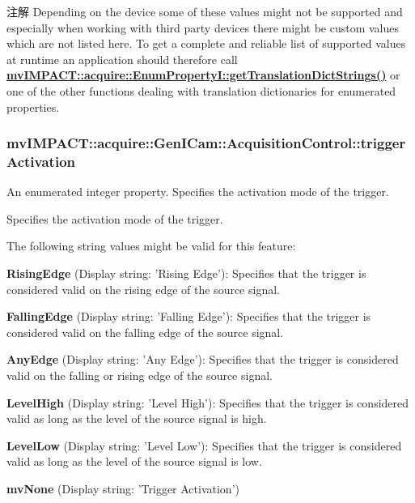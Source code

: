 \begin{DoxyNote}{注解}
Depending on the device some of these values might not be supported and especially when working with third party devices there might be custom values which are not listed here. To get a complete and reliable list of supported values at runtime an application should therefore call {\bfseries \hyperlink{classmv_i_m_p_a_c_t_1_1acquire_1_1_enum_property_i_a0ba6ccbf5ee69784d5d0b537924d26b6}{mv\+I\+M\+P\+A\+C\+T\+::acquire\+::\+Enum\+Property\+I\+::get\+Translation\+Dict\+Strings()}} or one of the other functions dealing with translation dictionaries for enumerated properties. 
\end{DoxyNote}
\hypertarget{classmv_i_m_p_a_c_t_1_1acquire_1_1_gen_i_cam_1_1_acquisition_control_aa99ab36c7369a029d2a7f05c59c3516b}{
\subsubsection[{trigger\+Activation}]{ mv\+I\+M\+P\+A\+C\+T\+::acquire\+::\+Gen\+I\+Cam\+::\+Acquisition\+Control\+::trigger\+Activation}}\label{classmv_i_m_p_a_c_t_1_1acquire_1_1_gen_i_cam_1_1_acquisition_control_aa99ab36c7369a029d2a7f05c59c3516b}


An enumerated integer property. Specifies the activation mode of the trigger. 

Specifies the activation mode of the trigger.

The following string values might be valid for this feature\+:
\begin{DoxyItemize}
\item {\bfseries Rising\+Edge} (Display string\+: 'Rising Edge')\+: Specifies that the trigger is considered valid on the rising edge of the source signal.
\item {\bfseries Falling\+Edge} (Display string\+: 'Falling Edge')\+: Specifies that the trigger is considered valid on the falling edge of the source signal.
\item {\bfseries Any\+Edge} (Display string\+: 'Any Edge')\+: Specifies that the trigger is considered valid on the falling or rising edge of the source signal.
\item {\bfseries Level\+High} (Display string\+: 'Level High')\+: Specifies that the trigger is considered valid as long as the level of the source signal is high.
\item {\bfseries Level\+Low} (Display string\+: 'Level Low')\+: Specifies that the trigger is considered valid as long as the level of the source signal is low.
\item {\bfseries mv\+None} (Display string\+: 'Trigger Activation')
\end{DoxyItemize}

